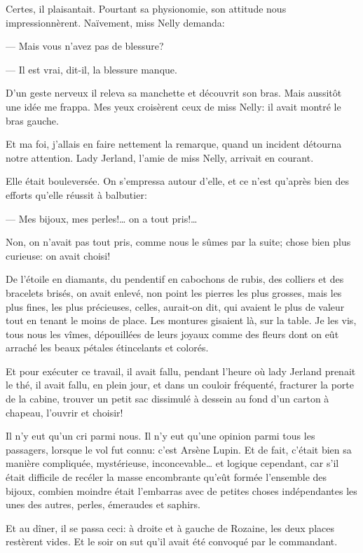 \documentclass[12pt,a4paper]{article}
\begin{document}
Certes, il plaisantait. Pourtant sa physionomie, son attitude nous impressionnèrent. Naïvement, miss Nelly demanda:

— Mais vous n’avez pas de blessure?

— Il est vrai, dit-il, la blessure manque.

D’un geste nerveux il releva sa manchette et découvrit son bras. Mais aussitôt une idée me frappa. Mes yeux croisèrent ceux de miss Nelly: il avait montré le bras gauche.

Et ma foi, j’allais en faire nettement la remarque, quand un incident détourna notre attention. Lady Jerland, l’amie de miss Nelly, arrivait en courant.

Elle était bouleversée. On s’empressa autour d’elle, et ce n’est qu’après bien des efforts qu’elle réussit à balbutier:

— Mes bijoux, mes perles!… on a tout pris!…

Non, on n’avait pas tout pris, comme nous le sûmes par la suite; chose bien plus curieuse: on avait choisi!

De l’étoile en diamants, du pendentif en cabochons de rubis, des colliers et des bracelets brisés, on avait enlevé, non point les pierres les plus grosses, mais les plus fines, les plus précieuses, celles, aurait-on dit, qui avaient le plus de valeur tout en tenant le moins de place. Les montures gisaient là, sur la table. Je les vis, tous nous les vîmes, dépouillées de leurs joyaux comme des fleurs dont on eût arraché les beaux pétales étincelants et colorés.

Et pour exécuter ce travail, il avait fallu, pendant l’heure où lady Jerland prenait le thé, il avait fallu, en plein jour, et dans un couloir fréquenté, fracturer la porte de la cabine, trouver un petit sac dissimulé à dessein au fond d’un carton à chapeau, l’ouvrir et choisir!

Il n’y eut qu’un cri parmi nous. Il n’y eut qu’une opinion parmi tous les passagers, lorsque le vol fut connu: c’est Arsène Lupin. Et de fait, c’était bien sa manière compliquée, mystérieuse, inconcevable… et logique cependant, car s’il était difficile de recéler la masse encombrante qu’eût formée l’ensemble des bijoux, combien moindre était l’embarras avec de petites choses indépendantes les unes des autres, perles, émeraudes et saphirs.

Et au dîner, il se passa ceci: à droite et à gauche de Rozaine, les deux places restèrent vides. Et le soir on sut qu’il avait été convoqué par le commandant.
\end{document}
